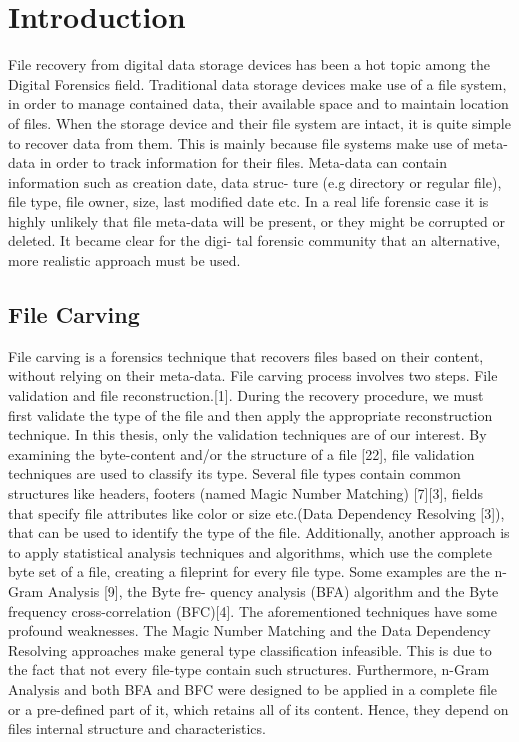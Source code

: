 \chapter{Introduction}
File recovery from digital data storage devices has been a hot topic among
the Digital Forensics field. Traditional data storage devices make use of a
file system, in order to manage contained data, their available space and to
maintain location of files. When the storage device and their file system are
intact, it is quite simple to recover data from them. This is mainly because
file systems make use of meta-data in order to track information for their
files. Meta-data can contain information such as creation date, data struc-
ture (e.g directory or regular file), file type, file owner, size, last modified
date etc. In a real life forensic case it is highly unlikely that file meta-data will be
present, or they might be corrupted or deleted. It became clear for the digi-
tal forensic community that an alternative, more realistic approach must be
used.

\section{File Carving}
File carving is a forensics technique that recovers files based on their content,
without relying on their meta-data. File carving process involves two steps.
File validation and file reconstruction.[1]. During the recovery procedure,
we must first validate the type of the file and then apply the appropriate
reconstruction technique. In this thesis, only the validation techniques are
of our interest.
By examining the byte-content and/or the structure of
a file [22], file validation techniques are used to classify its type. Several file
types contain common structures like headers, footers (named Magic Number
Matching) [7][3], fields that specify file attributes like color or size etc.(Data
Dependency Resolving [3]), that can be used to identify the type of the file.
Additionally, another approach is to apply statistical analysis techniques and
algorithms, which use the complete byte set of a file, creating a fileprint for
every file type. Some examples are the n-Gram Analysis [9], the Byte fre-
quency analysis (BFA) algorithm and the Byte frequency cross-correlation
(BFC)[4].
The aforementioned techniques have some profound weaknesses. The Magic
Number Matching and the Data Dependency Resolving approaches make
general type classification infeasible. This is due to the fact that not every
file-type contain such structures. Furthermore, n-Gram Analysis and both
BFA and BFC were designed to be applied in a complete file or a pre-defined
part of it, which retains all of its content. Hence, they depend on files internal structure and characteristics.
